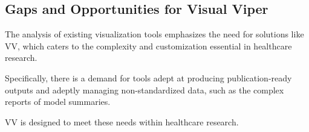 \subsection{Gaps and Opportunities for Visual Viper}\label{gaps-and-opportunities-for-visual-viper}

The analysis of existing visualization tools emphasizes the need for solutions like VV, which caters to the complexity and customization essential in healthcare research.

Specifically, there is a demand for tools adept at producing publication-ready outputs and adeptly managing non-standardized data, such as the complex reports of model summaries.

VV is designed to meet these needs within healthcare research.